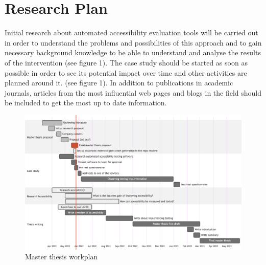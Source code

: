 \documentclass{thesis_proposal}
\begin{document}
\section{Research Plan}
Initial research about automated accessibility evaluation tools will be carried out in order to understand the problems and possibilities of this approach and to gain necessary background knowledge to be able to understand and analyse the results of the intervention (see figure 1).
The case study should be started as soon as possible in order to see its potential impact over time and other activities are planned around it.  (see figure 1).
In addition to publications in academic journals, articles from the most influential web pages and blogs in the field should be included to get the most up to date information.

\begin{figure}[ht!]
    \includegraphics[width=1\textwidth]{img/timeline.png}
    \caption{Master thesis workplan}
\end{figure}

\printbibliography{}
\end{document}

